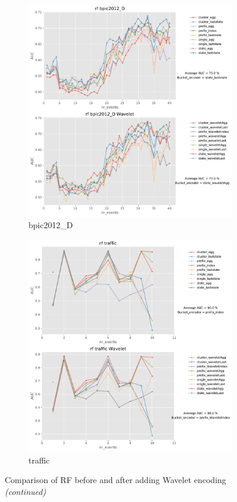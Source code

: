 \documentclass[twoside,11pt]{Latex/Classes/PhDthesisPSnPDF}
\begin{document}
\begin{figure}[!htbp]
	\medskip
	\begin{subfigure}{0.48\textwidth}
		\includegraphics[width=\linewidth]{images/wavelet/graphs2rf/bpic2012_D.pdf}	
		\caption{bpic2012\_D} 
	\end{subfigure}\hspace*{\fill}
	\begin{subfigure}{0.48\textwidth}
		\includegraphics[width=\linewidth]{images/wavelet/graphs2rf/traffic.pdf}
		\caption{traffic}
	\end{subfigure}
	\caption{Comparison of RF before and after adding Wavelet encoding \textit{(continued)}}
	\label{fig:wr2}
\end{figure}
\end{document}

